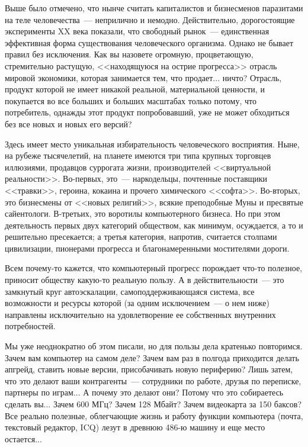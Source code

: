 \documentclass{scrbook}
\newcommand{\flqq}{<<}
\newcommand{\frqq}{>>}
\newcommand{\mdash}{~--- }
\begin{document}
Выше было отмечено, что нынче считать капиталистов и бизнесменов паразитами на теле человечества{\mdash}неприлично и немодно. Действительно, дорогостоящие эксперименты XX века показали, что свободный рынок{\mdash}единственная эффективная форма существования человеческого организма. Однако не бывает правил без исключения. Как вы назовете огромную, процветающую, стремительно растущую, {\flqq}находящуюся на острие прогресса{\frqq} отрасль мировой экономики, которая занимается тем, что продает... ничто? Отрасль, продукт которой не имеет никакой реальной, материальной ценности, и покупается во все больших и больших масштабах только потому, что потребитель, однажды этот продукт попробовавший, уже не может обходиться без все новых и новых его версий?

Здесь имеет место уникальная избирательность человеческого восприятия. Ныне, на рубеже тысячелетий, на планете имеются три типа крупных торговцев иллюзиями, продавцов суррогата жизни, производителей {\flqq}виртуальной реальности{\frqq}. Во-первых, это{\mdash}наркодельцы, почтенные поставщики {\flqq}травки{\frqq}, героина, кокаина и прочего химического {\flqq}софта{\frqq}. Во-вторых, это бизнесмены от {\flqq}новых религий{\frqq}, всякие преподобные Муны и пресвятые сайентологи. В-третьих, это воротилы компьютерного бизнеса. Но при этом деятельность первых двух категорий обществом, как минимум, осуждается, а то и решительно пресекается; а третья категория, напротив, считается столпами цивилизации, пионерами прогресса и благонамеренными мостителями дороги.

Всем почему-то кажется, что компьютерный прогресс порождает что-то полезное, приносит обществу какую-то реальную пользу. А в действительности{\mdash}это замкнутый круг автоэскалации, самоподдерживающаяся система, все возможности и ресурсы которой (за одним исключением{\mdash}о нем ниже) направлены исключительно на удовлетворение ее собственных внутренних потребностей.

Мы уже неоднократно об этом писали, но для пользы дела кратенько повторимся. Зачем вам компьютер на самом деле? Зачем вам раз в полгода приходится делать апгрейд, ставить новые версии, присобачивать новую периферию? Лишь затем, что это делают ваши контрагенты{\mdash}сотрудники по работе, друзья по переписке, партнеры по играм... А почему это делают они? Потому что это собираетесь сделать вы... Зачем 600 МГц? Зачем 128 Мбайт? Зачем видеокарта за 150 баксов? Все реально полезные, облегчающие жизнь и работу функции компьютера (почта, текстовый редактор, ICQ) лезут в древнюю 486-ю машину и еще место остается...
\end{document}
